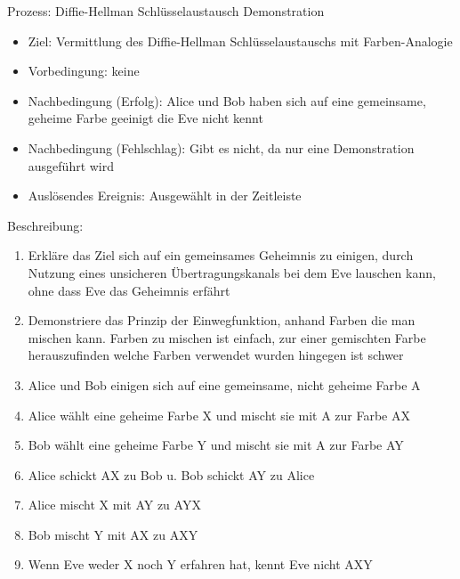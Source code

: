 \documentclass{article}
\begin{document}
\begin{FA}[start=100]
\item Prozess: Diffie-Hellman Schlüsselaustausch Demonstration
\end{FA}
\begin{itemize}[label={}]
    \item Ziel: Vermittlung des Diffie-Hellman Schlüsselaustauschs mit Farben-Analogie
    \item Vorbedingung: keine
    \item Nachbedingung (Erfolg): Alice und Bob haben sich auf eine
        gemeinsame, geheime Farbe geeinigt die Eve nicht kennt
    \item Nachbedingung (Fehlschlag): Gibt es nicht, da nur
        eine Demonstration ausgeführt wird
    \item Auslösendes Ereignis: Ausgewählt in der Zeitleiste
\end{itemize}

Beschreibung:
\begin{enumerate}
    \item Erkläre das Ziel sich auf ein gemeinsames Geheimnis zu einigen,
        durch Nutzung eines unsicheren Übertragungskanals
        bei dem Eve lauschen kann, ohne dass Eve das Geheimnis erfährt
    \item Demonstriere das Prinzip der Einwegfunktion, anhand Farben die man mischen
        kann. Farben zu mischen ist einfach, zur einer gemischten Farbe
        herauszufinden welche Farben verwendet wurden hingegen ist schwer
    \item Alice und Bob einigen sich auf eine gemeinsame, nicht geheime Farbe A
    \item Alice wählt eine geheime Farbe X und mischt sie mit A zur Farbe AX
    \item Bob wählt eine geheime Farbe Y und mischt sie mit A zur Farbe AY
    \item Alice schickt AX zu Bob u. Bob schickt AY zu Alice
    \item Alice mischt X mit AY zu AYX
    \item Bob mischt Y mit AX zu AXY
    \item Wenn Eve weder X noch Y erfahren hat, kennt Eve nicht AXY
\end{enumerate}
\end{document}
